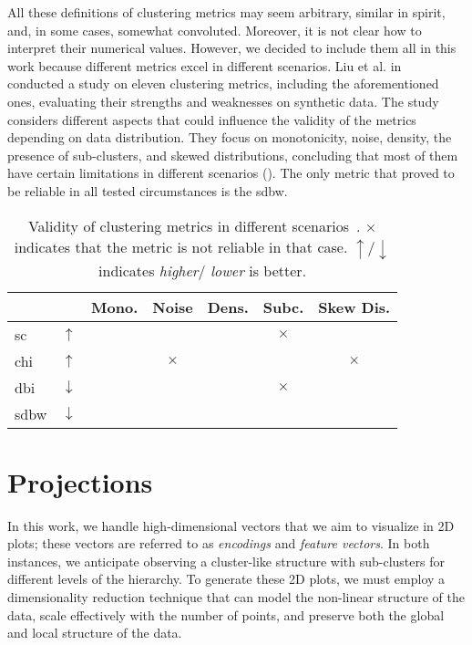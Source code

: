 All these definitions of clustering metrics may seem arbitrary, similar in spirit, and, in some cases, somewhat convoluted. Moreover, it is not clear how to interpret their numerical values. However, we decided to include them all in this work because different metrics excel in different scenarios. Liu et al. in~\cite{UnderstandingOLiuY2010} conducted a study on eleven clustering metrics, including the aforementioned ones, evaluating their strengths and weaknesses on synthetic data. The study considers different aspects that could influence the validity of the metrics depending on data distribution. They focus on monotonicity, noise, density, the presence of sub-clusters, and skewed distributions, concluding that most of them have certain limitations in different scenarios (). The only metric that proved to be reliable in all tested circumstances is the \acrshort{sdbw}.
\begin{table}[h!]
  \renewcommand{\arraystretch}{1.2}%
  \centering
  \begin{tabular}{ |l l c c c c c| }
    \hline          &              & Mono. & Noise  & Dens. & Subc.  & Skew Dis. \\ \hline
    \acrshort{sc}   & $\uparrow  $ &       &        &       & $\times$ &           \\
    \acrshort{chi}  & $\uparrow  $ &       & $\times$ &       &        & $\times$    \\
    \acrshort{dbi}  & $\downarrow$ &       &        &       & $\times$ &           \\
    \acrshort{sdbw} & $\downarrow$ &       &        &       &        &           \\ \hline
  \end{tabular}
  \caption{Validity of clustering metrics in different scenarios~\cite{UnderstandingOLiuY2010}. $\times$ indicates that the metric is not reliable in that case. $\uparrow / \downarrow$ indicates \emph{higher}$/$ \emph{lower} is better.} \label{tab:clustering-metrics-study}
\end{table}

\section{Projections}
\label{sec:projections}

In this work, we handle high-dimensional vectors that we aim to visualize in 2D plots; these vectors are referred to as \emph{encodings} and \emph{feature vectors}.
In both instances, we anticipate observing a cluster-like structure with sub-clusters for different levels of the hierarchy. To generate these 2D plots, we must employ a dimensionality reduction technique that can model the non-linear structure of the data, scale effectively with the number of points, and preserve both the global and local structure of the data.

